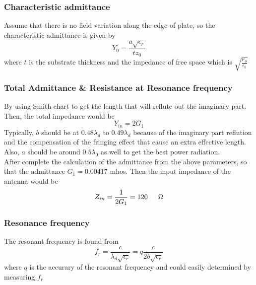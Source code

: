 \documentclass[11pt,a4paper,hidelinks]{article}
\begin{document}
      \subsubsection{Characteristic admittance}
        \indent Assume that there is no field variation along the edge of plate, so the characteristic admittance is given by \cite{CaM:81}
        \begin{equation}
          Y_0 = \frac{a\sqrt{\epsilon_r}}{tz_0}
        \end{equation}
        \indent where $t$ is the substrate thickness and the impedance of free space which is $\sqrt{\frac{\mu_0}{\epsilon_0}}$

      \subsubsection{Total Admittance \& Resistance at Resonance frequency}
        \indent By using Smith chart to get the length that will reflute out the imaginary part. Then, the total impedance would be
        \begin{equation}
          Y_{in} = 2G_1
        \end{equation}
        \indent Typically, $b$ should be at $0.48\lambda_d$ to $0.49\lambda_d$ because of the imaginary part reflution
                and the compensation of the fringing effect that cause an extra effective length. Also, $a$ should be around
                $0.5\lambda_0$ as well to get the best power radiation.  \\[1ex]
        \indent After complete the calculation of the admittance from the above parameters, so that the admittance
                $G_1 = 0.00417$ mhos. Then the input impedance of the antenna would be
        \begin{equation}
          Z_{in} = \frac{1}{2G_1} = 120 \indent \Omega
        \end{equation}

      \subsubsection{Resonance frequency}
        \indent The resonant frequency is found from
        \begin{equation}
          f_r = \frac{c}{\lambda_d\sqrt{\epsilon_r}} = q\frac{c}{2b\sqrt{\epsilon_r}}
        \end{equation}
        \indent where $q$ is the accurary of the resonant frequency and could easily determined by measuring $f_r$ \cite{CaM:81}
      
\end{document}
